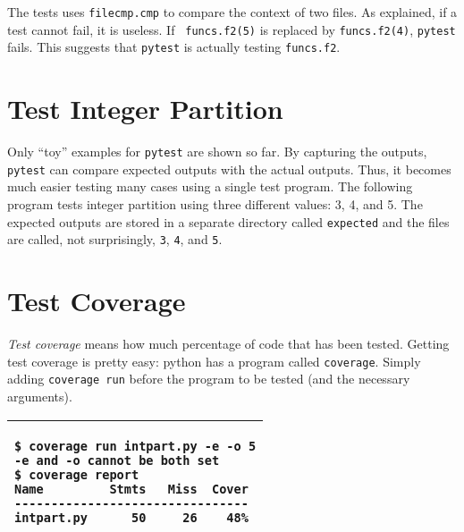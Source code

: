 {\resetlinenumber[1]
\linenumbers
\begin{tt}
  
\end{tt}
\nolinenumbers

The tests uses {\tt filecmp.cmp} to compare the context of two files.
As explained, if a test cannot fail, it is useless. If {\tt
  funcs.f2(5)} is replaced by {\tt funcs.f2(4)}, {\tt pytest} fails.
This suggests that {\tt pytest} is actually testing {\tt funcs.f2}.

\section{Test Integer Partition}

Only ``toy'' examples for {\tt pytest} are shown so far.  By capturing
the outputs, {\tt pytest} can compare expected outputs with the actual
outputs.  Thus, it becomes much easier testing many cases using a
single test program. The following program tests integer partition
using three different values: 3, 4, and 5. The expected outputs are
stored in a separate directory called {\tt expected} and the files are
called, not surprisingly, {\tt 3}, {\tt 4}, and {\tt 5}.

\resetlinenumber[1]
\linenumbers
\begin{tt}
  
\end{tt}
\nolinenumbers

\section{Test Coverage}



{\it Test coverage} means how much percentage of code that has been
tested.  Getting test coverage is pretty easy: python has a program
called {\tt coverage}. Simply adding {\tt coverage run} before the
program to be tested (and the necessary arguments).


\vspace{0.2in}

\noindent
\begin{tabular}{|p{5in}|}\hline
\begin{verbatim}
$ coverage run intpart.py -e -o 5
-e and -o cannot be both set
$ coverage report
Name         Stmts   Miss  Cover
--------------------------------
intpart.py      50     26    48%
\end{verbatim}
\\ \hline
\end{tabular}
\vspace{0.2in}

}
